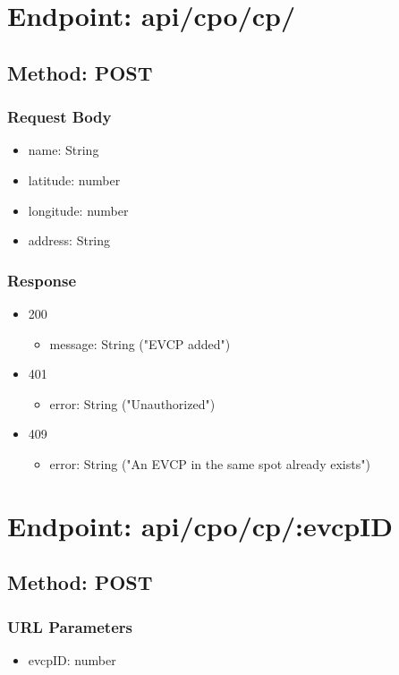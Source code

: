 \section*{Endpoint: api/cpo/cp/}
\subsection*{Method: POST}
\subsubsection*{Request Body}
\begin{itemize}
    \item name: String
    \item latitude: number
    \item longitude: number
    \item address: String
\end{itemize}
\subsubsection*{Response}
\begin{itemize}
    \item 200
          \begin{itemize}
              \item message: String ("EVCP added")
          \end{itemize}
    \item 401
          \begin{itemize}
              \item error: String ("Unauthorized")
          \end{itemize}
    \item 409
          \begin{itemize}
              \item error: String ("An EVCP in the same spot already exists")
          \end{itemize}
\end{itemize}

\section*{Endpoint: api/cpo/cp/:evcpID}
\subsection*{Method: POST}
\subsubsection*{URL Parameters}
\begin{itemize}
    \item evcpID: number
\end{itemize}

